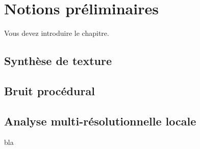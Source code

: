 \chapter{Notions préliminaires}
\label{chap:chapitre1}


Vous devez introduire le chapitre.

\section{Synthèse de texture}














\section{Bruit procédural}

\section{Analyse multi-résolutionnelle locale}

bla